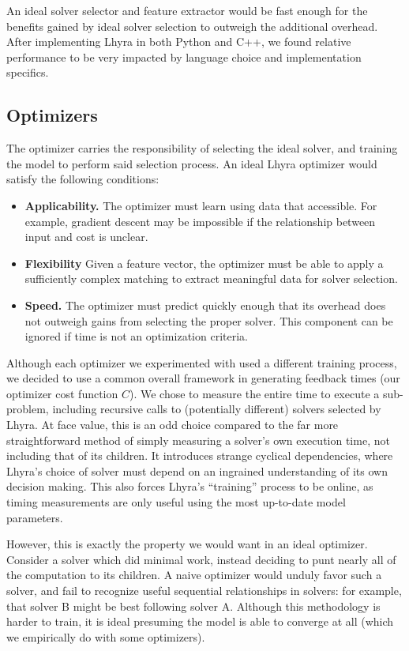 \documentclass{article}
\begin{document}
An ideal solver selector and feature extractor would be fast enough for the benefits gained by ideal solver selection to outweigh the additional overhead. After implementing Lhyra in both Python and C++, we found relative performance to be very impacted by language choice and implementation specifics.

\subsection{Optimizers}

The optimizer carries the responsibility of selecting the ideal solver, and training the model to perform said selection process.  An ideal Lhyra optimizer would satisfy the following conditions:

\begin{itemize}
    \item \textbf{Applicability.} The optimizer must learn using data that accessible. For example, gradient descent may be impossible if the relationship between input and cost is unclear.
    \item \textbf{Flexibility} Given a feature vector, the optimizer must be able to apply a sufficiently complex matching to extract meaningful data for solver selection.
    \item \textbf{Speed.} The optimizer must predict quickly enough that its overhead does not outweigh gains from selecting the proper solver. This component can be ignored if time is not an optimization criteria.
\end{itemize}

Although each optimizer we experimented with used a different training process, we decided to use a common overall framework in generating feedback times (our optimizer cost function $C$).  We chose to measure the entire time to execute a sub-problem, including recursive calls to (potentially different) solvers selected by Lhyra.  At face value, this is an odd choice compared to the far more straightforward method of simply measuring a solver's own execution time, not including that of its children.  It introduces strange cyclical dependencies, where Lhyra's choice of solver must depend on an ingrained understanding of its own decision making.  This also forces Lhyra's ``training'' process to be online, as timing measurements are only useful using the most up-to-date model parameters.

However, this is exactly the property we would want in an ideal optimizer.  Consider a solver which did minimal work, instead deciding to punt nearly all of the computation to its children.  A naive optimizer would unduly favor such a solver, and fail to recognize useful sequential relationships in solvers: for example, that solver B might be best following solver A.  Although this methodology is harder to train, it is ideal presuming the model is able to converge at all (which we empirically do with some optimizers). 
\end{document}
